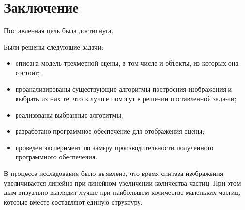 \chapter*{Заключение}

Поставленная цель была достигнута.
 
Были решены следующие задачи:
\begin{itemize}
	\item описана модель трехмерной сцены, в том числе и объекты, из которых она состоит;
	\item проанализированы существующие алгоритмы построения изображения и выбрать из них те, что в лучше помогут в решении поставленной зада-чи;
	\item реализованы выбранные алгоритмы;
	\item разработано программное обеспечение для отображения сцены;
	\item проведен эксперимент по замеру производительности полученного программного обеспечения.
\end{itemize}

В процессе исследования было выявлено, что время синтеза изображения увеличивается линейно при линейном увеличении количества частиц. При этом дым визуально выглядит лучше при наибольшем количестве маленьких частиц, которые вместе составляют единую структуру.